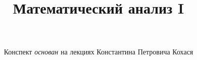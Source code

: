 \documentclass[12pt, a4paper, oneside]{book}
\title{\textbf{Математический анализ I}}
\author{
\\
\\
Конспект \textit{основан} на лекциях Константина Петровича Кохася}
\date{}
\begin{document}
\maketitle
\mainmatter
\tableofcontents
\pagebreak




\end{document}
